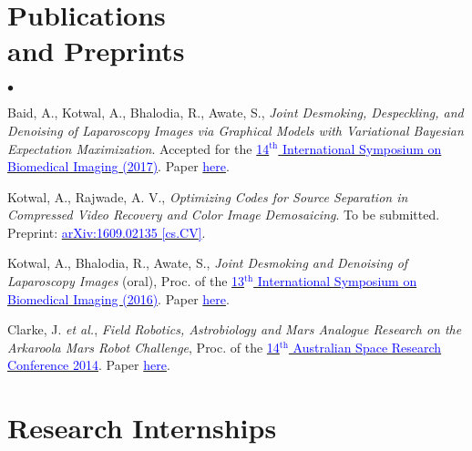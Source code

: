 \documentclass[margin,line]{res}
\newenvironment{list2}{
  \begin{list}{$\bullet$}{%
      \setlength{\itemsep}{0in}
      \setlength{\parsep}{0in} \setlength{\parskip}{0in}
      \setlength{\topsep}{0in} \setlength{\partopsep}{0in} 
      \setlength{\leftmargin}{0.2in}}}{\end{list}}
\begin{document}
\begin{resume}
\section{\sc Publications \\ and Preprints}
\begin{list2}
\item Baid, A., Kotwal, A., Bhalodia, R., Awate, S., {\em Joint Desmoking, Despeckling, and Denoising of Laparoscopy Images via Graphical Models with Variational Bayesian Expectation Maximization}. Accepted for the \href{http://biomedicalimaging.org/2017/}{\textcolor{blue} {14$^\text{th}$ International Symposium on Biomedical Imaging (2017)}}. Paper \href{http://alankarkotwal.github.io/pubs/isbi17.pdf}{\textcolor{blue} {here}}.
\item Kotwal, A., Rajwade, A. V., {\em Optimizing Codes for Source Separation in Compressed Video Recovery and Color Image Demosaicing}. To be submitted. %
Preprint: \href{https://arxiv.org/abs/1609.02135}{\textcolor{blue} {arXiv:1609.02135 [cs.CV]}}.
\item Kotwal, A., Bhalodia, R., Awate, S., {\em Joint Desmoking and Denoising of Laparoscopy Images} (oral), Proc. of the \href{http://biomedicalimaging.org/2016/}{\textcolor{blue} {13$^\text{th}$ International Symposium on Biomedical Imaging (2016)}}. Paper \href{http://alankarkotwal.github.io/pubs/isbi16.pdf}{\textcolor{blue} {here}}.
\item Clarke, J. {\em et al.}, {\em Field Robotics, Astrobiology and Mars Analogue Research on the Arkaroola Mars Robot Challenge}, Proc. of the \href{http://www.nssa.com.au/14asrc/14ASRC-proceedings.zip}{\textcolor{blue} {14$^\text{th}$ Australian Space Research Conference 2014}}. Paper \href{http://alankarkotwal.github.io/pubs/asrc14.pdf}{\textcolor{blue} {here}}.
\end{list2}

\section{\sc Research Internships} 


\end{resume}
\end{document}
